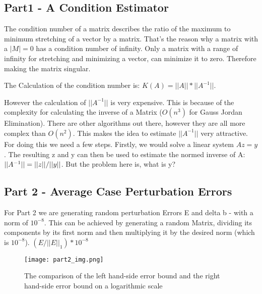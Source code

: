 \documentclass{article}
\begin{document}
\par\noindent

\subsection{Part1 - A Condition Estimator}
The condition number of a matrix describes the ratio of the maximum to minimum stretching of a vector by a matrix. That's the reason why a matrix with a \(|M| = 0\)  has a condition number of infinity.
Only a matrix with a range of infinity for stretching and minimizing a vector, can minimize it to zero. Therefore making the matrix singular.
\par\noindent
The Calculation of the condition number is:
\(K(A) = ||A|| * ||A^{-1}||\).
\par\noindent
However the calculation of \(||A^{-1}||\) is very expensive. This is because of the complexity for calculating the inverse of a Matrix ($O(n^3)$ for Gauss Jordan Elimination).
There are other algorithms out there, however they are all more complex than $O(n^2)$.
This makes the idea to estimate  \(||A^{-1}||\) very attractive. For doing this we need a few steps.
Firstly, we would solve a linear system \(A z = y\).
The resulting z and y can then be used to estimate the normed inverse of A: \(\\||A^{-1}|| =||z|| / ||y|| \).
But the problem here is, what is y? 

\subsection{Part 2 -  Average Case Perturbation Errors}
For Part 2 we are generating random perturbation Errors E and delta b - with a norm of \(10^{-8}\).
This can be achieved by generating a random Matrix, dividing its components by its first norm and then multiplying it by the desired norm (which is \(10^{-8}\)).
\((E / ||E||_1) * 10^{-8}\)
\par\noindent

\begin{figure}
    \centering
    \texttt{[image: part2\_img.png]}
    \caption{The comparison of the left hand-side error bound and the right hand-side error bound on a logarithmic scale}
    \label{fig:part2_result}
\end{figure}
\end{document}
